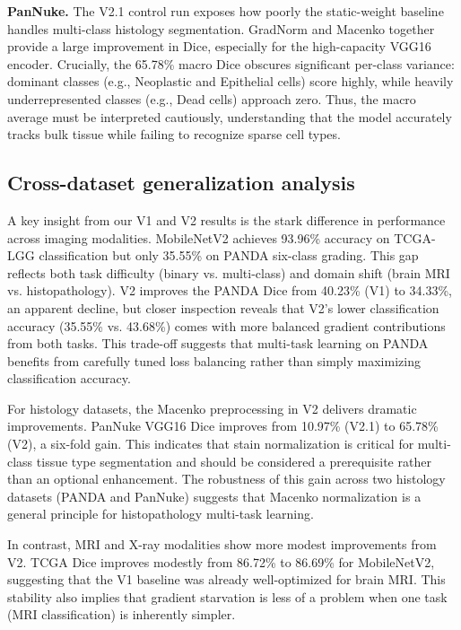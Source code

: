 \documentclass[conference,a4paper]{IEEEtran}
\begin{document}
\textbf{PanNuke.} The V2.1 control run exposes how poorly the static-weight baseline handles multi-class histology segmentation. GradNorm and Macenko together provide a large improvement in Dice, especially for the high-capacity VGG16 encoder. Crucially, the 65.78\% macro Dice obscures significant per-class variance: dominant classes (e.g., Neoplastic and Epithelial cells) score highly, while heavily underrepresented classes (e.g., Dead cells) approach zero. Thus, the macro average must be interpreted cautiously, understanding that the model accurately tracks bulk tissue while failing to recognize sparse cell types.

\subsection{Cross-dataset generalization analysis}
A key insight from our V1 and V2 results is the stark difference in performance across imaging modalities. MobileNetV2 achieves 93.96\% accuracy on TCGA-LGG classification but only 35.55\% on PANDA six-class grading. This gap reflects both task difficulty (binary vs. multi-class) and domain shift (brain MRI vs. histopathology). V2 improves the PANDA Dice from 40.23\% (V1) to 34.33\%, an apparent decline, but closer inspection reveals that V2's lower classification accuracy (35.55\% vs. 43.68\%) comes with more balanced gradient contributions from both tasks. This trade-off suggests that multi-task learning on PANDA benefits from carefully tuned loss balancing rather than simply maximizing classification accuracy.

For histology datasets, the Macenko preprocessing in V2 delivers dramatic improvements. PanNuke VGG16 Dice improves from 10.97\% (V2.1) to 65.78\% (V2), a six-fold gain. This indicates that stain normalization is critical for multi-class tissue type segmentation and should be considered a prerequisite rather than an optional enhancement. The robustness of this gain across two histology datasets (PANDA and PanNuke) suggests that Macenko normalization is a general principle for histopathology multi-task learning.

In contrast, MRI and X-ray modalities show more modest improvements from V2. TCGA Dice improves modestly from 86.72\% to 86.69\% for MobileNetV2, suggesting that the V1 baseline was already well-optimized for brain MRI. This stability also implies that gradient starvation is less of a problem when one task (MRI classification) is inherently simpler.
\end{document}
